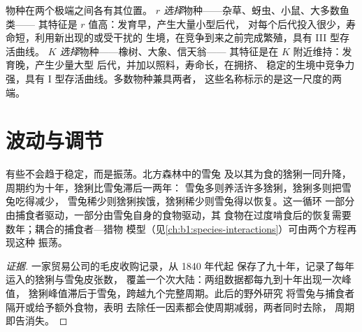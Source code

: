 \begin{definition}[生活史策略]\label{def:b1:populations:rK}
物种在两个极端之间各有其位置。
\emph{$r$ 选择}物种——杂草、蚜虫、小鼠、大多数鱼类——
其特征是 $r$ 值高：发育早，产生大量小型后代，
对每个后代投入很少，寿命短，利用新出现的或受干扰的
生境，在竞争到来之前完成繁殖，具有 III 型存活曲线。
\emph{$K$ 选择}物种——橡树、大象、信天翁——
其特征是在 $K$ 附近维持：发育晚，产生少量大型
后代，并加以照料，寿命长，在拥挤、
稳定的生境中竞争力强，具有 I 型存活曲线。多数物种兼具两者，
这些名称标示的是这一尺度的两端。
\end{definition}

\section{波动与调节}

\begin{proposition}[捕食者与猎物的循环]\label{prop:b1:populations:cycles}
有些不会趋于稳定，而是振荡。北方森林中的雪兔
及以其为食的猞猁一同升降，
周期约为十年，猞猁比雪兔滞后一两年：
雪兔多则养活许多猞猁，猞猁多则把雪兔吃得减少，
雪兔稀少则猞猁挨饿，猞猁稀少则雪兔得以恢复。这一循环
一部分由捕食者驱动，一部分由雪兔自身的食物驱动，其
食物在过度啃食后的恢复需要数年；耦合的捕食者—猎物
模型（见\cref{ch:b1:species-interactions}）可由两个方程再现这种
振荡。
\end{proposition}
\begin{proof}[证据]
一家贸易公司的毛皮收购记录，从 1840 年代起
保存了九十年，记录了每年运入的猞猁与雪兔皮张数，
覆盖一个次大陆：两组数据都每九到十年出现一次峰值，
猞猁峰值滞后于雪兔，跨越九个完整周期。此后的野外研究
将雪兔与捕食者隔开或给予额外食物，表明
去除任一因素都会使周期减弱，两者同时去除，
周期即告消失。
\end{proof}

